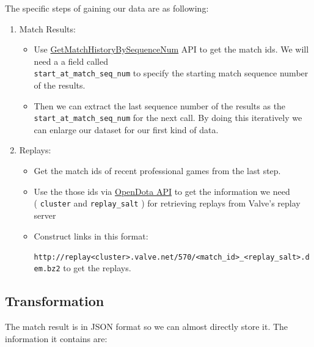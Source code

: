 \documentclass{article}
\newcommand{\codeinline}[1]{
	\texttt{#1}
}
\begin{document}
The specific steps of gaining our data are as following:

\begin{enumerate}
\item Match Results:
	\begin{itemize}
		\item Use \href{https://wiki.teamfortress.com/wiki/WebAPI/GetMatchHistoryBySequenceNum}{GetMatchHistoryBySequenceNum} API to get the match ids. We will need a a field called \\ \codeinline{start_at_match_seq_num} to specify the starting match sequence number of the results.
		\item Then we can extract the last sequence number of the results as the \codeinline{start_at_match_seq_num} for the next call. By doing this iteratively we can enlarge our dataset for our first kind of data.
	\end{itemize}
\item Replays:
	\begin{itemize}
		\item Get the match ids of recent professional games from the last step.
		\item Use the those ids via \href{https://docs.opendota.com/#tag/matches}{OpenDota API} to get the information we need \\ (\codeinline{cluster} and \codeinline{replay_salt}) for retrieving replays from Valve's replay server
		\item Construct links in this format:\\  \codeinline{ http://replay<cluster>.valve.net/570/<match_id>_<replay_salt>.dem.bz2} to get the replays.
	\end{itemize}
\end{enumerate}


\subsection{Transformation}

The match result is in JSON format so we can almost directly store it. The information it contains are:
\end{document}
